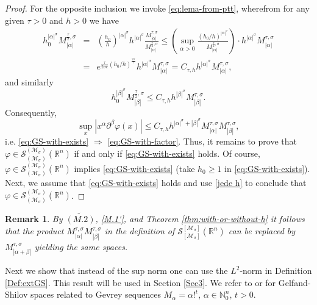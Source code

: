 \documentclass{article}
\theoremstyle{thmstyleone}
\theoremstyle{thmstyletwo}%
\newtheorem{Remark}[Theorem]{Remark}%
\theoremstyle{thmstylethree}%
\begin{document}
\begin{proof}
 For the opposite inclusion we invoke \eqref{eq:lema-from-ptt}, wherefrom   
 for any given $\tau > 0$ and $h>0$ we have
\begin{eqnarray*}
h_0 ^{|\alpha|^\sigma} M^{\frac{\tau}{2}, \sigma} _{|\alpha|} & = &
\left ( \frac{h_0 }{h} \right ) ^{|\alpha|^\sigma} h ^{|\alpha|^\sigma} 
\frac{ M^{\tau, \sigma} _{|\alpha|}}{ M^{\frac{\tau}{2}, \sigma} _{|\alpha|}}
\leq \left(  \sup_{\alpha >0} 
\frac{( h_0 /h ) ^{|\alpha|^\sigma}}{M^{\frac{\tau}{2}, \sigma} _{|\alpha|}} \right)
\cdot
h ^{|\alpha|^\sigma}  M^{\tau, \sigma} _{|\alpha|} \\
& = & e^{\frac{\tau}{2\sigma e}  ( h_0 /h ) ^{\frac{2\sigma}{\tau}}}  
h ^{|\alpha|^\sigma}  M^{\tau, \sigma} _{|\alpha|} 
= C_{\tau, h} h ^{|\alpha|^\sigma}  M^{\tau, \sigma} _{|\alpha|},     
\end{eqnarray*}
and similarly
$$ h_0 ^{|\beta|^\sigma} M^{\frac{\tau}{2}, \sigma} _{|\beta|} \leq
 C_{\tau,h} h ^{|\beta|^\sigma}  M^{\tau, \sigma} _{|\beta|}.
$$
Consequently,
$$
 \sup_{x} |x^\alpha \partial^\beta \varphi(x)|\leq
  C_{\tau, h} h ^{|\alpha|^\sigma + |\beta|^\sigma}  M^{\tau, \sigma} _{|\alpha|} 
  M^{\tau, \sigma} _{|\beta|},
$$
i.e.  \eqref{eq:GS-with-exists}  $ \Rightarrow$ \eqref{eq:GS-with-factor}.
Thus, it remains to prove that $ \varphi \in \mathcal S_{(\mathcal{M}_\sigma ) }^{ (\mathcal{M}_\sigma)} (\mathbb R^n)$ if and only if \eqref{eq:GS-with-exists} holds.
Of course, $ \varphi \in \mathcal S_{(\mathcal{M}_\sigma ) }^{ (\mathcal{M}_\sigma)} (\mathbb R^n)$ implies  \eqref{eq:GS-with-exists} (take $h_0 \geq 1 $ in 
\eqref{eq:GS-with-exists}). Next, we
assume that \eqref{eq:GS-with-exists} holds and use
\eqref{jede h} to conclude that
$ \varphi \in \mathcal S_{(\mathcal{M}_\sigma ) }^{ (\mathcal{M}_\sigma)} (\mathbb R^n)$.
\end{proof}




\begin{Remark} \label{rem:alfa-beta}
By  $\widetilde{(M.2)}$, \eqref{M.1'}, and Theorem \ref{thm:with-or-without-h}
it follows that the product $M^{\tau, \sigma} _{|\alpha|} 
  M^{\tau, \sigma} _{|\beta|}$ in the definition of 
$\mathcal S_{[\mathcal{M}_\sigma ] }^{ [\mathcal{M}_\sigma]} (\mathbb R^n)$ can be replaced by $M^{\tau, \sigma} _{|\alpha + \beta|}$ yielding the same spaces.
 \end{Remark}

Next we show that instead of the sup norm one can use the $L^2$-norm
in Definition \ref{Def:extGS}. This result will be used in Section \ref{Sec3}.
We refer to \cite[Theorem 1]{Pil89} or 
\cite[Theorem 6.1.6]{Nicola-Rodino}
for Gelfand-Shilov spaces related to Gevrey sequences $ M_{\alpha} = \alpha ! ^t$, $\alpha\in \mathbb N_0 ^n$, $ t>0$.
\end{document}

